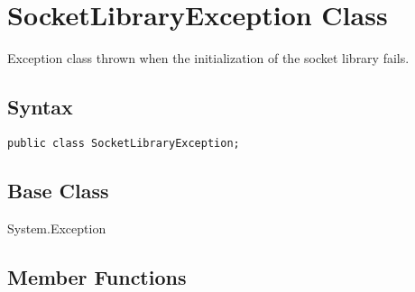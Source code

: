 \documentclass[a4paper,oneside,11.000000pt]{book}
\begin{document}
\hypertarget{System.Net.Sockets.SocketLibraryException}{\section{SocketLibraryException Class}}
\begin{flushleft}
Exception class thrown when the initialization of the socket library fails.

\end{flushleft}
\subsection*{Syntax}\texttt{public class SocketLibraryException;}

\subsection*{Base Class}System.Exception\subsection{Member Functions}
\end{document}
